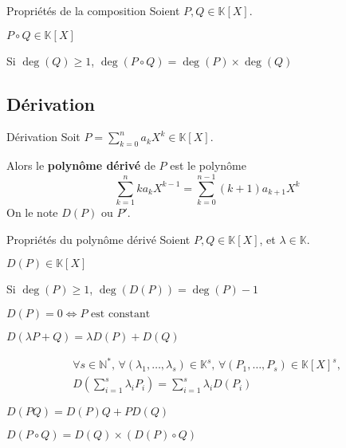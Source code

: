     \begin{prop}{Propriétés de la composition}{}
        Soient $P,Q \in \mathbb{K}[X]$. 
    
        \begin{alors}
            \item $P \circ Q \in \mathbb{K}[X]$
            \item Si $\deg(Q) \geq 1$, $\deg(P \circ Q) = \deg(P) \times \deg(Q)$
        \end{alors}
    \end{prop}

\subsection{Dérivation}

    \begin{defi}{Dérivation}{}
        Soit $P = \sum\limits_{k = 0}^n a_k X^k \in \mathbb{K}[X]$.
    
        Alors le \textbf{polynôme dérivé} de $P$ est le polynôme 
        \[ \sum\limits_{k = 1}^n k a_k X^{k-1} = \sum\limits_{k = 0}^{n-1} (k+1) a_{k+1} X^k \] 
        On le note $D(P)$ ou $P'$.
    \end{defi}
    
    \begin{prop}{Propriétés du polynôme dérivé}{}
        Soient $P,Q \in \mathbb{K}[X]$, et $\lambda \in \mathbb{K}$.
    
        \begin{alors}
            \item $D(P) \in \mathbb{K}[X]$
            \item Si $\deg(P) \geq 1$, $\deg(D(P)) = \deg(P)-1$
            \item $D(P) = 0 \iff P \text{ est constant}$
            \item $D(\lambda P + Q) = \lambda D(P) + D(Q)$
            \item \begin{multline*}
                \forall s \in \mathbb{N}^*, \, \forall (\lambda_1, \ldots, \lambda_s) \in \mathbb{K}^s, \, \forall (P_1, \ldots, P_s) \in \mathbb{K}[X]^s, \\
                D\left( \sum\limits_{i=1}^s \lambda_i P_i \right) = \sum\limits_{i=1}^s \lambda_i D(P_i)
            \end{multline*}
            \item $D(PQ) = D(P)Q + PD(Q)$
            \item $D(P \circ Q) = D(Q) \times (D(P) \circ Q)$
        \end{alors}
    \end{prop}
    
